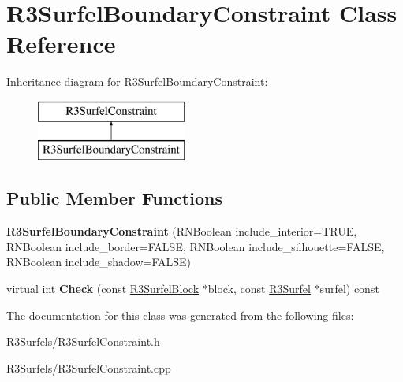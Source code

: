 \hypertarget{class_r3_surfel_boundary_constraint}{}\section{R3\+Surfel\+Boundary\+Constraint Class Reference}
\label{class_r3_surfel_boundary_constraint}
Inheritance diagram for R3\+Surfel\+Boundary\+Constraint\+:\begin{figure}[H]
\begin{center}
\leavevmode
\includegraphics[height=2.000000cm]{class_r3_surfel_boundary_constraint}
\end{center}
\end{figure}
\subsection*{Public Member Functions}
\begin{DoxyCompactItemize}
\item 
{\bfseries R3\+Surfel\+Boundary\+Constraint} (R\+N\+Boolean include\+\_\+interior=T\+R\+UE, R\+N\+Boolean include\+\_\+border=F\+A\+L\+SE, R\+N\+Boolean include\+\_\+silhouette=F\+A\+L\+SE, R\+N\+Boolean include\+\_\+shadow=F\+A\+L\+SE)\hypertarget{class_r3_surfel_boundary_constraint_a1dfbd52c6ed90e92d1ab5d6719f44afe}{}\label{class_r3_surfel_boundary_constraint_a1dfbd52c6ed90e92d1ab5d6719f44afe}

\item 
virtual int {\bfseries Check} (const \hyperlink{class_r3_surfel_block}{R3\+Surfel\+Block} $\ast$block, const \hyperlink{class_r3_surfel}{R3\+Surfel} $\ast$surfel) const \hypertarget{class_r3_surfel_boundary_constraint_ae69e6f1836e1ac338a28b6c8f13fad25}{}\label{class_r3_surfel_boundary_constraint_ae69e6f1836e1ac338a28b6c8f13fad25}

\end{DoxyCompactItemize}


The documentation for this class was generated from the following files\+:\begin{DoxyCompactItemize}
\item 
R3\+Surfels/R3\+Surfel\+Constraint.\+h\item 
R3\+Surfels/R3\+Surfel\+Constraint.\+cpp\end{DoxyCompactItemize}
